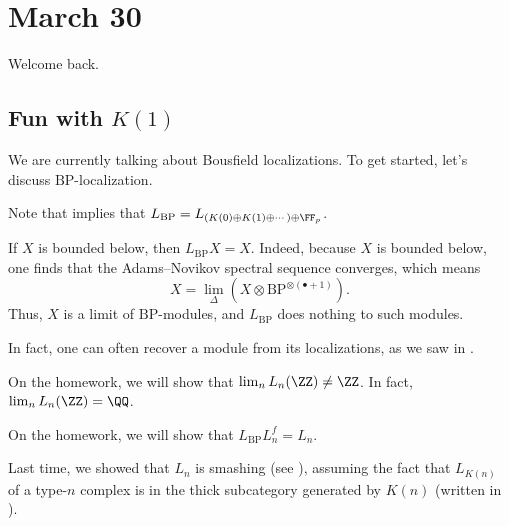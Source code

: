 \documentclass[../notes.tex]{subfiles}
\begin{document}
\section{March 30}

Welcome back.

\subsection{Fun with \texorpdfstring{$K(1)$}{ K(1)}}
We are currently talking about Bousfield localizations. To get started, let's discuss $\mathrm{BP}$-localization.
\begin{remark}
	Note that  implies that $L_{\mathrm{BP}}=L_{(K(0)\oplus K(1)\oplus\cdots)\oplus\FF_p}$.
\end{remark}
\begin{remark}
	If $X$ is bounded below, then $L_{\mathrm{BP}}X=X$. Indeed, because $X$ is bounded below, one finds that the Adams--Novikov spectral sequence converges, which means
	\[X=\lim_\Delta\left(X\otimes\mathrm{BP}^{\otimes(\bullet+1)}\right).\]
	Thus, $X$ is a limit of $\mathrm{BP}$-modules, and $L_{\mathrm{BP}}$ does nothing to such modules.
\end{remark}
In fact, one can often recover a module from its localizations, as we saw in .
\begin{example}
	On the homework, we will show that $\lim_nL_n(\ZZ)\ne\ZZ$. In fact, $\lim_nL_n(\ZZ)=\QQ$.
\end{example}
\begin{remark}
	On the homework, we will show that $L_{\mathrm{BP}}L_n^f=L_n$.
\end{remark}
Last time, we showed that $L_n$ is smashing (see ), assuming the fact that $L_{K(n)}$ of a type-$n$ complex is in the thick subcategory generated by $K(n)$ (written in ).
\end{document}
